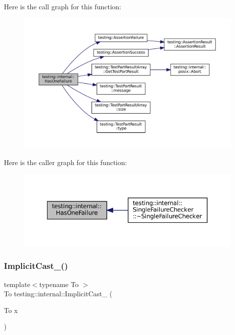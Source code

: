 Here is the call graph for this function\+:
\nopagebreak
\begin{figure}[H]
\begin{center}
\leavevmode
\includegraphics[width=350pt]{namespacetesting_1_1internal_a14ff02e6d151f45e998657674e9af88a_cgraph}
\end{center}
\end{figure}
Here is the caller graph for this function\+:
\nopagebreak
\begin{figure}[H]
\begin{center}
\leavevmode
\includegraphics[width=349pt]{namespacetesting_1_1internal_a14ff02e6d151f45e998657674e9af88a_icgraph}
\end{center}
\end{figure}
\mbox{\label{namespacetesting_1_1internal_a982df3f369643b175f79cda4048bc3b9}} 
\subsubsection{\texorpdfstring{Implicit\+Cast\+\_\+()}{ImplicitCast\_()}}
{\footnotesize\ttfamily template$<$typename To $>$ \\
To testing\+::internal\+::\+Implicit\+Cast\+\_\+ (\begin{DoxyParamCaption}\item[{To}]{x }\end{DoxyParamCaption})\hspace{0.3cm}{\ttfamily [inline]}}



